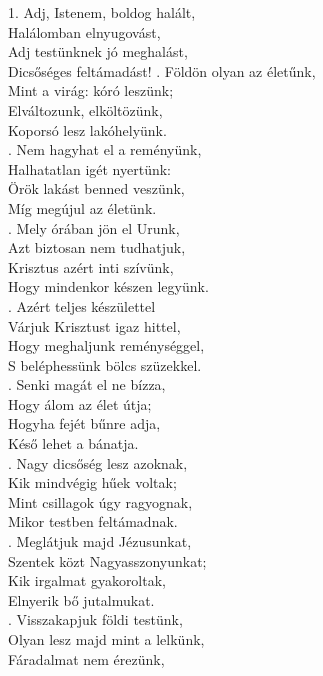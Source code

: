 \documentclass[twoside]{article}
\begin{document}
\begin{hymnstanzas}
  1. Adj, Istenem, boldog halált,\\
  Halálomban elnyugovást,\\
  Adj testünknek jó meghalást,\\
  Dicsőséges feltámadást!
. Földön olyan az életűnk,\\
  Mint a virág: kóró leszünk;\\
  Elváltozunk, elköltözünk,\\
  Koporsó lesz lakóhelyünk.\\
. Nem hagyhat el a reményünk,\\
  Halhatatlan igét nyertünk:\\
  Örök lakást benned veszünk,\\
  Míg megújul az életünk.\\
. Mely órában jön el Urunk,\\
  Azt biztosan nem tudhatjuk,\\
  Krisztus azért inti szívünk,\\
  Hogy mindenkor készen legyünk.\\
. Azért teljes készülettel\\
  Várjuk Krisztust igaz hittel,\\
  Hogy meghaljunk reménységgel,\\
  S beléphessünk bölcs szüzekkel.\\
. Senki magát el ne bízza,\\
  Hogy álom az élet útja;\\
  Hogyha fejét bűnre adja,\\
  Késő lehet a bánatja.\\
. Nagy dicsőség lesz azoknak,\\
  Kik mindvégig hűek voltak;\\
  Mint csillagok úgy ragyognak,\\
  Mikor testben feltámadnak.\\
. Meglátjuk majd Jézusunkat,\\
  Szentek közt Nagyasszonyunkat;\\
  Kik irgalmat gyakoroltak,\\
  Elnyerik bő jutalmukat.\\
. Visszakapjuk földi testünk,\\
  Olyan lesz majd mint a lelkünk,\\
  Fáradalmat nem érezünk,\\

\end{hymnstanzas}
\end{document}
